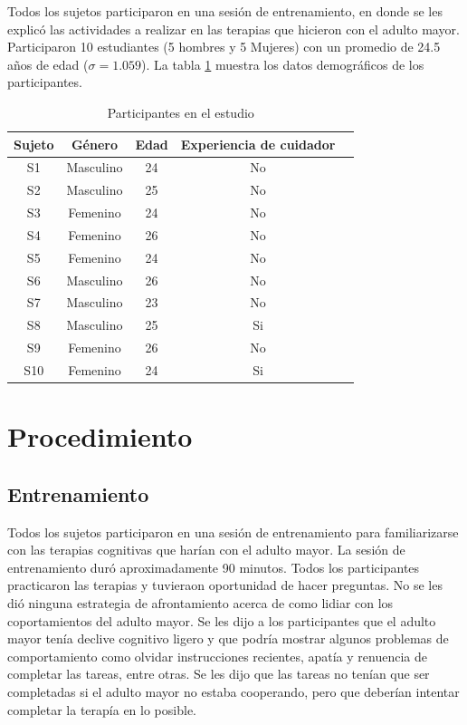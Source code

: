 Todos los sujetos participaron en una sesi\'on de entrenamiento, en donde se les explic\'o las actividades a realizar en las terapias que hicieron con el adulto mayor.
Participaron 10 estudiantes (5 hombres y 5 Mujeres) con un promedio de 24.5 a\~nos de edad ($\sigma=1.059$). La tabla \ref{table:kysymys} muestra los datos demogr\'aficos de los participantes.

\begin{table}[h]
\centering
\caption{Participantes en el estudio}
\label{table:kysymys}
\begin{tabular}{|c|c|c|c|c|}
\hline
 \textbf{Sujeto}&  \textbf{G\'enero}&  \textbf{Edad}&  \textbf{Experiencia de cuidador}  \\ \hline
 S1& Masculino & 24 & No   \\ \hline
 S2& Masculino &  25&  No  \\ \hline
 S3& Femenino & 24 & No   \\ \hline
 S4& Femenino & 26 & No  \\ \hline
 S5& Femenino & 24 & No   \\ \hline
 S6& Masculino & 26 &  No  \\ \hline
 S7& Masculino & 23 &  No \\ \hline
 S8& Masculino & 25 &  Si  \\ \hline
 S9& Femenino & 26 & No   \\ \hline
 S10& Femenino & 24 & Si  \\ \hline
\end{tabular}
\end{table}
\section{Procedimiento}\label{secc:methods}
\subsection{Entrenamiento}\label{secc:training}
Todos los sujetos participaron en una sesi\'on de entrenamiento para familiarizarse con las terapias cognitivas que har\'ian con el adulto mayor. La sesi\'on de entrenamiento dur\'o aproximadamente 90 minutos. Todos los participantes practicaron las terapias y tuvieraon oportunidad de hacer preguntas. No se les di\'o ninguna estrategia de afrontamiento acerca de como lidiar con los coportamientos del adulto mayor. Se les dijo a los participantes que el adulto mayor ten\'ia declive cognitivo ligero y que podr\'ia mostrar algunos problemas de comportamiento como olvidar instrucciones recientes, apat\'ia y renuencia de completar las tareas, entre otras. Se les dijo que las tareas no ten\'ian que ser completadas si el adulto mayor no estaba cooperando, pero que deber\'ian intentar completar la terap\'ia en lo posible.

